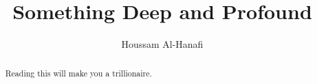 \documentclass{article}
\title{Something Deep and Profound}
\author{Houssam Al-Hanafi}
\date{}
\begin{document}
\maketitle


\begin{abstract}
    Reading this will make you a trillionaire.
\end{abstract}



\appendix




\end{document}

